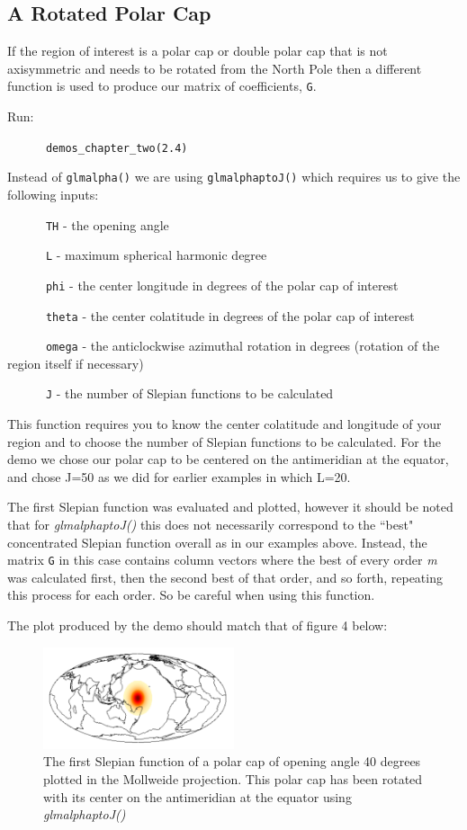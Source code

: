 \documentclass[11pt]{article}
\begin{document}
\subsection{A Rotated Polar Cap}

If the region of interest is a polar cap or double polar cap that is not axisymmetric and needs to be rotated from the North Pole then a different function is used to produce our matrix of coefficients, \verb|G|.

Run:

\verb|		demos_chapter_two(2.4)|

Instead of \verb|glmalpha()| we are using \verb|glmalphaptoJ()| which requires us to give the following inputs:

\verb|		TH| - the opening angle

\verb|		L| - maximum spherical harmonic degree

\verb|		phi| - the center longitude in degrees of the polar cap of interest

\verb|		theta| - the center colatitude in degrees of the polar cap of interest

\verb|		omega| - the anticlockwise azimuthal rotation in degrees (rotation of the region itself if necessary)

\verb|		J| - the number of Slepian functions to be calculated

This function requires you to know the center colatitude and longitude of your region and to choose the number of Slepian functions to be calculated. For the demo we chose our polar cap to be centered on the antimeridian at the equator, and chose J=50 as we did for earlier examples in which L=20. 

The first Slepian function was evaluated and plotted, however it should be noted that for \textit{glmalphaptoJ()} this does not necessarily correspond to the ``best" concentrated Slepian function overall as in our examples above. Instead, the matrix \verb|G| in this case contains column vectors where the best of every order \textit{m} was calculated first, then the second best of that order, and so forth, repeating this process for each order. So be careful when using this function. 

The plot produced by the demo should match that of figure 4 below:

\begin{figure}[H]
  \centering
  \includegraphics[width=0.5\textwidth]{figures/figure4A.png}
  \caption{The first Slepian function of a polar cap of opening angle 40 degrees plotted in the Mollweide projection. This polar cap has been rotated with its center on the antimeridian at the equator using \textit{glmalphaptoJ()}}
\label{figure4}
\end{figure}
\end{document}
